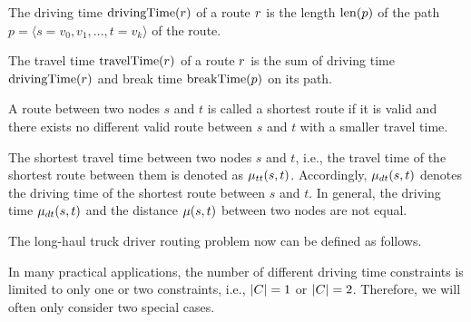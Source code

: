 \begin{definition}
	The driving time $\operatorname{drivingTime}(r)$ of a route $r$ is the length $\operatorname{len}(p)$ of the path $p = \langle s=v_0,v_1,...,t=v_k \rangle$ of the route.
\end{definition}

\begin{definition}
	The travel time $\operatorname{travelTime}(r)$ of a route $r$ is the sum of driving time $\operatorname{drivingTime}(r)$ and break time  $\operatorname{breakTime}(p)$ on its path.
\end{definition}

\begin{definition}
	A route between two nodes $s$ and $t$ is called a shortest route if it is valid and there exists no different valid route between $s$ and $t$ with a smaller travel time.
\end{definition}

The shortest travel time between two nodes $s$ and $t$, i.e., the travel time of the shortest route between them is denoted as $\mu_{tt}(s,t)$. Accordingly, $\mu_{dt}(s,t)$ denotes the driving time of the shortest route between $s$ and $t$. In general, the driving time $\mu_{dt}(s,t)$ and the distance $\mu(s,t)$ between two nodes are not equal.

The long-haul truck driver routing problem now can be defined as follows.

\begin{namedproblem}
\end{namedproblem}

In many practical applications, the number of different driving time constraints is limited to only one or two constraints, i.e., $|C| = 1$ or  $|C| = 2$. Therefore, we will often only consider two special cases.